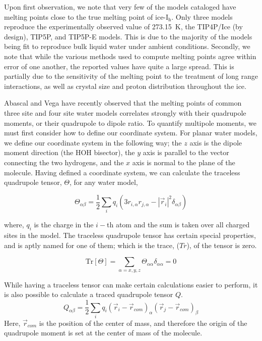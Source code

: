 Upon first observation, we note that very few of the models cataloged
have melting points close to the true melting point of
ice-I$_\mathrm{h}$.  Only three models reproduce the experimentally
observed value of 273.15~K, the TIP4P/Ice (by design), TIP5P, and
TIP5P-E models. This is due to the majority of the models being fit to
reproduce bulk liquid water under ambient conditions. Secondly, we note
that while the various methods used to compute melting points agree
within error of one another, the reported values have quite a large
spread. This is partially due to the sensitivity of the melting point
to the treatment of long range interactions\cite{Arbuckle2002,
  Bryk2004}, as well as crystal size\cite{Pan2011} and proton
distribution throughout the ice.\cite{Louden2017}

Abascal and Vega have recently observed that the melting points of
common three site and four site water models correlates strongly with
their quadrupole moments, or their quadrupole to dipole
ratio.\cite{Abascal2007,Abascal2007a,Abascal2007b,Abascal2007c} To
quantify multipole moments, we must first consider how to define our
coordinate system. For planar water models, we define our coordinate
system in the following way; the $z$ axis is the dipole moment
direction (the HOH bisector), the $y$ axis is parallel to the vector
connecting the two hydrogens, and the $x$ axis is normal to the plane of
the molecule. Having defined a coordinate system, we can calculate the
traceless quadrupole tensor, $\Theta$, for any water model,

\begin{equation}
\Theta_{\alpha \beta} = \frac{1}{2}
\sum_{i}q_{i}(3r_{i,\alpha}r_{j,\alpha}-|\vec{r}_{i}|^{2}\delta_{\alpha
  \beta})
\end{equation}

where, $q_i$ is the charge in the $i-$th atom and the sum is taken
over all charged sites in the model. The traceless quadrupole tensor
has certain special properties, and is aptly named for one of them;
which is the trace, ($Tr$), of the tensor is zero.

\begin{equation}
\mathrm{Tr}[\Theta] = \sum_{\alpha = x,y,z}\Theta_{\alpha
  \alpha}\delta_{\alpha \alpha} = 0
\end{equation}

While having a traceless tensor can make certain calculations easier to 
perform, it is also possible to calculate a traced quadrupole tensor $Q$.
\begin{equation}
Q_{\alpha \beta} = \frac{1}{2}\sum_{i}q_{i}(\vec{r}_{i}-\vec{r}_{com})_{\alpha} (\vec{r}_{j}-\vec{r}_{com})_{\beta}
\end{equation}
Here, $\vec{r}_{com}$ is the position of the center of mass, and
therefore the origin of the quadrupole moment is set at the center of
mass of the molecule.

